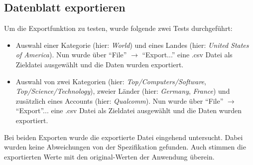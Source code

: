 \subsection{Datenblatt exportieren}
Um die Exportfunktion zu testen, wurde folgende zwei Tests durchgeführt:
\begin{itemize}
	\item Auswahl einer Kategorie (hier: \textit{World}) und eines Landes (hier: \textit{United States of America}). Nun wurde über "`File"' $\to$ "`Export..."' eine .csv Datei als Zieldatei ausgewählt und die Daten wurden exportiert.
	\item Auswahl von zwei Kategorien (hier: \textit{Top/Computers/Software}, \textit{Top/Science/Technology}), zweier Länder (hier: \textit{Germany}, \textit{France}) und zusätzlich eines Accounts (hier: \textit{Qualcomm}). Nun wurde über "`File"' $\to$ "`Export"'... eine .csv Datei als Zieldatei ausgewählt und die Daten wurden exportiert.
\end{itemize}
Bei beiden Exporten wurde die exportierte Datei eingehend untersucht. Dabei wurden keine Abweichungen von der Spezifikation gefunden. Auch stimmen die exportierten Werte mit den original-Werten der Anwendung überein.
